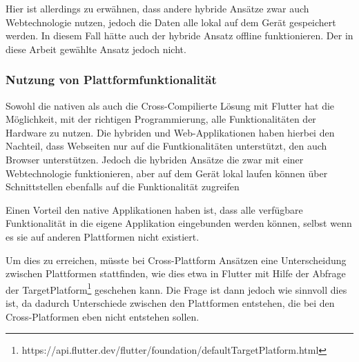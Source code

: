 Hier ist allerdings zu erwähnen, dass andere hybride Ansätze zwar auch Webtechnologie nutzen, jedoch die Daten alle lokal auf dem Gerät gespeichert werden. In diesem Fall hätte auch der hybride Ansatz offline funktionieren. Der in diese Arbeit gewählte Ansatz jedoch nicht.

\subsubsection{Nutzung von Plattformfunktionalität}
Sowohl die nativen als auch die Cross-Compilierte Lösung mit Flutter hat die Möglichkeit, mit der richtigen Programmierung, alle Funktionalitäten der Hardware zu nutzen.
Die hybriden und Web-Applikationen haben hierbei den Nachteil, dass Webseiten nur auf die Funtkionalitäten unterstützt, den auch Browser unterstützen. Jedoch die hybriden Ansätze die zwar mit einer Webtechnologie funktionieren, aber auf dem Gerät lokal laufen können über Schnittstellen ebenfalls auf die Funktionalität zugreifen

Einen Vorteil den native Applikationen haben ist, dass alle verfügbare Funktionalität in die eigene Applikation eingebunden werden können, selbst wenn es sie auf anderen Plattformen nicht existiert.

Um dies zu erreichen, müsste bei Cross-Plattform Ansätzen eine Unterscheidung zwischen Plattformen stattfinden, wie dies etwa in Flutter mit Hilfe der Abfrage der TargetPlatform\footnote{https://api.flutter.dev/flutter/foundation/defaultTargetPlatform.html} geschehen kann. Die Frage ist dann jedoch wie sinnvoll dies ist, da dadurch Unterschiede zwischen den Plattformen entstehen, die bei den Cross-Platformen eben nicht entstehen sollen.

